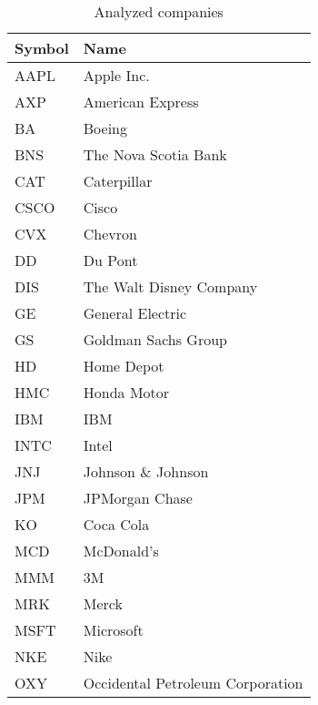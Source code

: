 \begin{table}\centering
	\caption{Analyzed companies}\label{tab:analyzedCompanies}
   	\begin{tabular}{ | p{3cm\textwidth} | p{7cm\textwidth} |}
   	\hline

\textbf{Symbol}           & \textbf{Name} \\\hline

AAPL   & Apple Inc.                        \\\hline
AXP    & American Express                  \\\hline
BA     & Boeing                            \\\hline
BNS    & The Nova Scotia Bank              \\\hline
CAT    & Caterpillar                       \\\hline
CSCO   & Cisco                             \\\hline
CVX    & Chevron                           \\\hline
DD     & Du Pont                           \\\hline
DIS    & The Walt Disney Company           \\\hline
GE     & General Electric                  \\\hline
GS     & Goldman Sachs Group               \\\hline
HD     & Home Depot                        \\\hline
HMC    & Honda Motor                       \\\hline
IBM    & IBM                               \\\hline
INTC   & Intel                             \\\hline
JNJ    & Johnson \& Johnson                \\\hline
JPM    & JPMorgan Chase                    \\\hline
KO     & Coca Cola                         \\\hline
MCD    & McDonald's                        \\\hline
MMM    & 3M                                \\\hline
MRK    & Merck                             \\\hline
MSFT   & Microsoft                         \\\hline
NKE    & Nike                              \\\hline
OXY    & Occidental Petroleum Corporation  \\\hline

\end{tabular}
\end{table}
